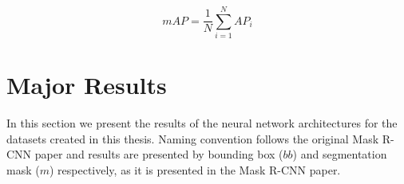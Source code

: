 \documentclass[english, bibtex]{kththesis}
\begin{document}
\begin{equation}
mAP = \frac{1}{N} \sum_{i=1}^{N} AP_i
    \label{eqn:map}
\end{equation}

\section{Major Results}

In this section we present the results of the neural network architectures for the datasets created in this thesis. Naming convention follows the original Mask R-CNN paper and results are presented by bounding box ($bb$) and segmentation mask ($m$) respectively, as it is presented in the Mask R-CNN paper.

\begin{table}[!htbp]
  \begin{center}
    \caption{Model names}
    \label{tab:modelnames}
  \end{center}
\end{table}
\end{document}
